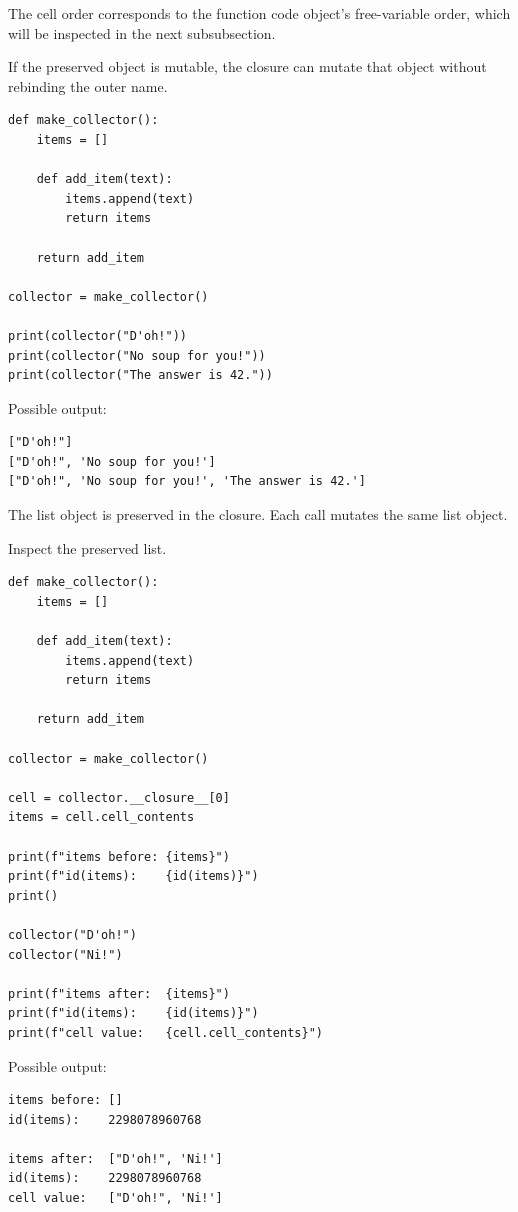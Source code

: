 The cell order corresponds to the function code object's free-variable order, which will be inspected in the next subsubsection.

If the preserved object is mutable, the closure can mutate that object without rebinding the outer name.

\begin{verbatim}
def make_collector():
    items = []

    def add_item(text):
        items.append(text)
        return items

    return add_item

collector = make_collector()

print(collector("D'oh!"))
print(collector("No soup for you!"))
print(collector("The answer is 42."))
\end{verbatim}

Possible output:

\begin{verbatim}
["D'oh!"]
["D'oh!", 'No soup for you!']
["D'oh!", 'No soup for you!', 'The answer is 42.']
\end{verbatim}

The list object is preserved in the closure. Each call mutates the same list object.

Inspect the preserved list.

\begin{verbatim}
def make_collector():
    items = []

    def add_item(text):
        items.append(text)
        return items

    return add_item

collector = make_collector()

cell = collector.__closure__[0]
items = cell.cell_contents

print(f"items before: {items}")
print(f"id(items):    {id(items)}")
print()

collector("D'oh!")
collector("Ni!")

print(f"items after:  {items}")
print(f"id(items):    {id(items)}")
print(f"cell value:   {cell.cell_contents}")
\end{verbatim}

Possible output:

\begin{verbatim}
items before: []
id(items):    2298078960768

items after:  ["D'oh!", 'Ni!']
id(items):    2298078960768
cell value:   ["D'oh!", 'Ni!']
\end{verbatim}

